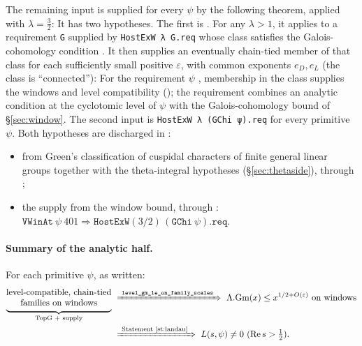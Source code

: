 The remaining input is supplied for every $\psi$ by the following theorem, applied with
$\lambda=\frac32$:
\noindent It has two hypotheses. The first is . For any $\lambda>1$, it
applies to a requirement \texttt{G} supplied by \texttt{HostExW λ G.req} whose class satisfies the
Galois-cohomology condition . It then supplies an eventually chain-tied
member of that class for each sufficiently small positive $\varepsilon$, with common exponents
$e_D,e_L$ (the class is ``connected''):
\noindent For the requirement  $\psi$
, membership in the class
supplies the windows and level compatibility (); the requirement
combines an analytic condition at the cyclotomic level of $\psi$ with the Galois-cohomology bound
 of \S\ref{sec:window}. The second input is
\texttt{HostExW λ (GChi ψ).req} for every primitive $\psi$. Both hypotheses are discharged in
:
\begin{itemize}
\item {} from Green's classification of cuspidal characters of finite
  general linear groups together with the theta-integral hypotheses (\S\ref{sec:thetaside}), through
  ;
\item the supply from the window bound, through 
  :
  $\texttt{VWinAt}\ \psi\ 401\Rightarrow\texttt{HostExW}(3/2)\,(\texttt{GChi}\ \psi)\texttt{.req}$.
\end{itemize}

\paragraph{Summary of the analytic half.} For each primitive $\psi$, as written:
\[
\begin{aligned}
\underbrace{\text{\begin{tabular}{@{}c@{}}level-compatible, chain-tied\\families on windows\end{tabular}}}_{\text{TopG + supply}}
&\ \xRightarrow{\ \texttt{level\_gm\_le\_on\_family\_scales}\ }\
\Lambda.\mathrm{Gm}(x)\le x^{1/2+O(\varepsilon)}\text{ on windows}\\
&\ \xRightarrow{\ \text{Statement \ref{st:landau}}\ }\
L(s,\psi)\ne0\ (\operatorname{Re}s>\tfrac12).
\end{aligned}
\]
